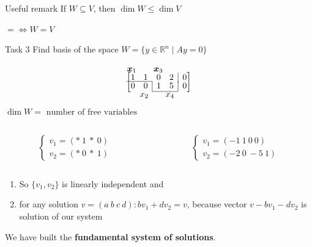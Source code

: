 \documentclass[fullscreen=true, bookmarks=true, hyperref={pdfencoding=unicode}]{beamer}
\begin{document}
\begin{frame}
  \begin{block}{Useful remark}
    If $W \subseteq V$, then $\dim W \le \dim V$

    \hspace{3.5cm} $= \Leftrightarrow W = V$
  \end{block}

  \pause
  \begin{block}{Task 3}
    Find basis of the space $W = \{y \in \mathbb{R}^n \mid Ay = 0\}$
  \end{block}
  \pause
  \vspace{-20pt}
  \begin{eqnarray*}
    \begin{matrix} \boldsymbol{x}_1 &  & \boldsymbol{x}_3 &  & \end{matrix} \quad\ \\[-7pt]
  \left[\begin{matrix}
    1 & 1 & 0 & 2 & \multicolumn{1}{|c}{0} \\[-2pt]
    \cline{1-2}
    0 & 0 & \multicolumn{1}{|c}{1} & 5 & \multicolumn{1}{|c}{0} \\
    \cline{3-4}
  \end{matrix}\right] \\[-7pt]
  \begin{matrix} & x_2 &  & x_4 &  \end{matrix} \quad
  \end{eqnarray*} 
  $\dim W = \text{ number of free variables}$
  \begin{columns}
    \begin{column}{0.4\paperwidth}
      \pause
      $$\begin{cases}
        v_1 = (*\ 1\ *\ 0) \\
        v_2 = (*\ 0\ *\ 1)
      \end{cases}$$          
    \end{column}
    \begin{column}{0.4\paperwidth}
      \pause
      $$\begin{cases}
        v_1 = (-1\ 1\ 0\ 0) \\
        v_2 = (-2\ 0\ -5\ 1)
      \end{cases}$$          
    \end{column}
  \end{columns}

  \pause
  {\small
  \begin{enumerate}
      \item So $\{v_1, v_2\}$ is linearly independent and 
      \item for any solution $v = (a\ b\ c\ d): bv_1 + dv_2 = v$, 
      because vector $v-bv_1 - dv_2$ is solution of our system
  \end{enumerate}
  We have built the \textbf{fundamental system of solutions}.}
\end{frame}
\end{document}
